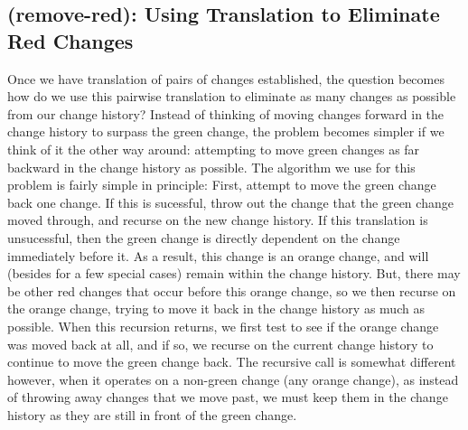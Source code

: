 \documentclass{article}
\begin{document}
\subsection{(remove-red): Using Translation to Eliminate Red Changes}

Once we have translation of pairs of changes established, 
the question becomes how do we use this pairwise translation 
to eliminate as many changes 
as possible from our change history? 
Instead of thinking of moving changes 
forward in the change history 
to surpass the green change, 
the problem becomes simpler 
if we think of it the other way around: 
attempting to move green changes 
as far backward 
in the change history as possible. 
The algorithm we use for this problem 
is fairly simple in principle: 
First, attempt to move the green change back one change. 
If this is sucessful, 
throw out the change that the green change moved through, 
and recurse on the new change history. 
If this translation is unsucessful, 
then the green change is directly dependent 
on the change immediately before it. 
As a result, 
this change is an orange change, 
and will (besides for a few special cases) 
remain within the change history. 
But, there may be other 
red changes that occur before this orange change, 
so we then recurse on the orange change, 
trying to move it back in the change history 
as much as possible. 
When this recursion returns, 
we first test to see if the orange change 
was moved back at all, 
and if so, 
we recurse on the current change history 
to continue to move the green change back. 
The recursive call is somewhat different however, 
when it operates on a non-green change (any orange change), 
as instead of throwing away changes 
that we move past, 
we must keep them in the change history 
as they are still in front of the green change.
\end{document}
